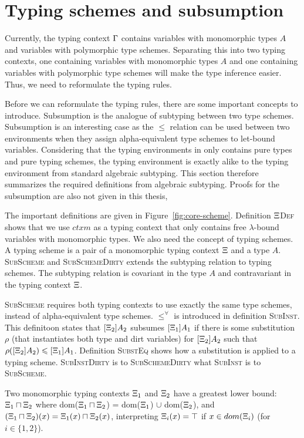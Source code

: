 \section{Typing schemes and subsumption}
Currently, the typing context $\Gamma$ contains variables with monomorphic types $A$ and variables with polymorphic type schemes. Separating this into two typing contexts, one containing variables with monomorphic types $A$ and one containing variables with polymorphic type schemes will make the type inference easier. Thus, we need to reformulate the typing rules. \cite{dolan2017algebraic}

Before we can reformulate the typing rules, there are some important concepts to introduce. Subsumption is the analogue of subtyping between two type schemes. Subsumption is an interesting case as the $\le$ relation can be used between two environments when they assign alpha-equivalent type schemes to let-bound variables. Considering that the typing environments in \core only contains pure types and pure typing schemes, the typing environment is exactly alike to the typing environment from standard algebraic subtyping. This section therefore summarizes the required definitions from algebraic subtyping. Proofs for the subsumption are also not given in this thesis, \cite{dolan2017algebraic}

The important definitions are given in Figure~\ref{fig:core-scheme}. Definition \textsc{$\Xi$Def} shows that we use $ctxm$ as a typing context that only contains free $\lambda$-bound variables with monomorphic types. We also need the concept of typing schemes. A typing scheme is a pair of a monomorphic typing context $\Xi$ and a type $A$. \textsc{SubScheme} and \textsc{SubSchemeDirty} extends the subtyping relation to typing schemes. The subtyping relation is covariant in the type $A$ and contravariant in the typing context $\Xi$. 

\textsc{SubScheme} requires both typing contexts to use exactly the same type schemes, instead of alpha-equivalent type schemes. $\le^\forall$ is introduced in definition \textsc{SubInst}. This definitoon states that $[\Xi_2]A_2$ subsumes $[\Xi_1]A_1$ if there is some substitution $\rho$ (that instantiates both type and dirt variables) for $[\Xi_2]A_2$ such that $\rho([\Xi_2]A_2) \leqslant [\Xi_1]A_1$. Definition \textsc{SubstEq} shows how a substitution is applied to a typing scheme. \textsc{SubInstDirty} is to \textsc{SubSchemeDirty} what \textsc{SubInst} is to \textsc{SubScheme}.

Two monomorphic typing contexts $\Xi_1$ and $\Xi_2$ have a greatest lower bound: $\Xi_1 \sqcap \Xi_2$ where dom($\Xi_1 \sqcap \Xi_2$) = dom($\Xi_1$) $\cup$ dom($\Xi_2$), and $(\Xi_1 \sqcap \Xi_2)(x) = \Xi_1(x) \sqcap \Xi_2(x)$, interpreting $\Xi_i(x) = \top$ if $x \in dom(\Xi_i)$ (for $i \in \{1, 2\}$). \cite{dolan2017algebraic}

